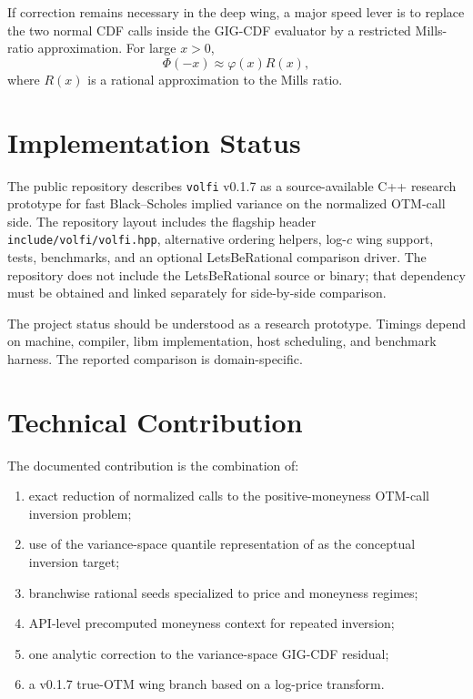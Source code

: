 \documentclass[11pt]{article}
\begin{document}
	If correction remains necessary in the deep wing, a major speed lever is to replace the two normal CDF calls inside the GIG-CDF evaluator by a restricted Mills-ratio approximation. For large $x>0$,
	\begin{equation}
		\Phi(-x)\approx \varphi(x)R(x),
	\end{equation}
	where $R(x)$ is a rational approximation to the Mills ratio.
	
	\section{Implementation Status}
	
	The public repository describes \texttt{volfi} v0.1.7 as a source-available C++ research prototype for fast Black--Scholes implied variance on the normalized OTM-call side. The repository layout includes the flagship header \texttt{include/volfi/volfi.hpp}, alternative ordering helpers, log-$c$ wing support, tests, benchmarks, and an optional LetsBeRational comparison driver. The repository does not include the LetsBeRational source or binary; that dependency must be obtained and linked separately for side-by-side comparison.
	
	The project status should be understood as a research prototype. Timings depend on machine, compiler, libm implementation, host scheduling, and benchmark harness. The reported comparison is domain-specific.
	
	\section{Technical Contribution}
	
	The documented contribution is the combination of:
	\begin{enumerate}[label=(\roman*)]
		\item exact reduction of normalized calls to the positive-moneyness OTM-call inversion problem;
		\item use of the variance-space quantile representation of \cite{schadner2026explicit} as the conceptual inversion target;
		\item branchwise rational seeds specialized to price and moneyness regimes;
		\item API-level precomputed moneyness context for repeated inversion;
		\item one analytic correction to the variance-space GIG-CDF residual;
		\item a v0.1.7 true-OTM wing branch based on a log-price transform.
	\end{enumerate}
	
\end{document}
